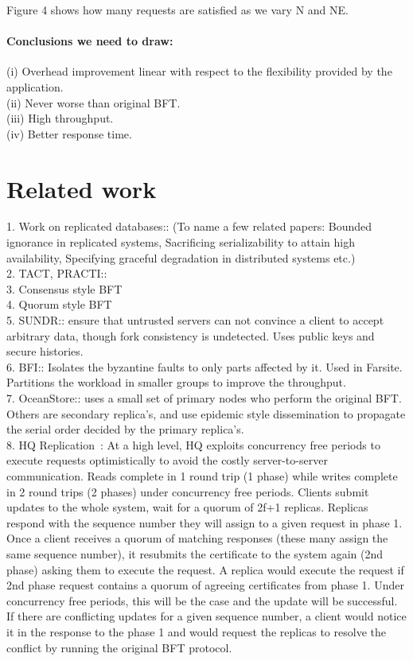 \documentclass[twocolumn,10pt]{article}
\begin{document}
{Figure 4 shows how many requests are satisfied as we vary N and NE.


\paragraph{Conclusions we need to draw:}
(i) Overhead improvement linear with respect to the flexibility provided by the application.\\
(ii) Never worse than original BFT.\\
(iii) High throughput.\\
(iv) Better response time.\\

\section{Related work}
1. Work on replicated databases::
 (To name a few related papers:
 Bounded ignorance in replicated systems,
 Sacrificing serializability to attain high availability, Specifying graceful
 degradation in distributed systems etc.)\\ 
2. TACT, PRACTI::\\
3. Consensus style BFT\\
4. Quorum style BFT \\
5. SUNDR:: ensure that untrusted servers can not convince a 
 client to accept arbitrary data, though fork consistency is 
 undetected. Uses public keys and secure histories.\\
6. BFI::
 Isolates the byzantine faults to only parts affected by it.
 Used in Farsite. Partitions the workload in smaller groups to improve
 the throughput.\\
7. OceanStore::
 uses a small set of primary nodes who perform the
 original BFT. Others are secondary replica's, and use epidemic style
 dissemination to propagate the serial order decided by the primary 
 replica's.\\
8. HQ Replication~\cite{hq-replication-osdi-06}: At a high level, HQ exploits 
concurrency free periods to execute requests optimistically 
to avoid the costly server-to-server communication. Reads complete in 1
round trip (1 phase) while writes complete in 2 round trips (2 phases) under 
concurrency free periods. Clients submit updates to the whole system, wait for 
a quorum of 2f+1 replicas. Replicas respond with the sequence number they 
will assign to a given request in phase 1. Once a client receives a quorum 
of matching responses (these many assign the same sequence number),
it resubmits the certificate to the system again (2nd phase) asking them to 
execute the request. A replica would execute the request if 2nd phase 
request contains a quorum of agreeing certificates from phase 1. Under 
concurrency free periods, this will be the case and the update will be 
successful. If there are conflicting updates for a given sequence number, a 
client would notice it in the response to the phase 1 and would request the 
replicas to resolve the conflict by running the original BFT protocol. 

}
\end{document}

